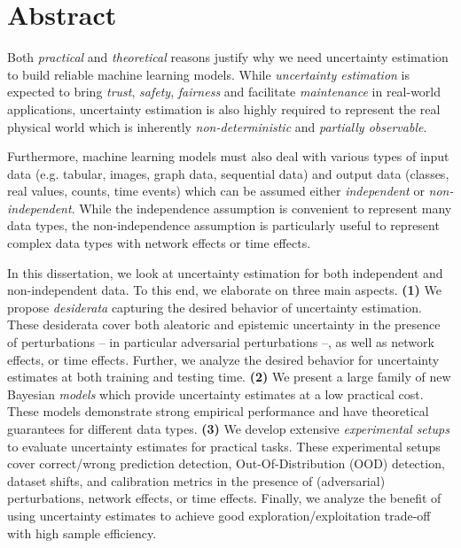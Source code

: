 \chapter*{Abstract}
%

Both \emph{practical} and \emph{theoretical} reasons justify why we need uncertainty estimation to build reliable machine learning models. While \emph{uncertainty estimation} is expected to bring \emph{trust}, \emph{safety}, \emph{fairness} and facilitate \emph{maintenance} in real-world applications, uncertainty estimation is also highly required to represent the real physical world which is inherently \emph{non-deterministic} and \emph{partially observable}. 

Furthermore, machine learning models must also deal with various types of input data (e.g. tabular, images, graph data, sequential data) and output data (classes, real values, counts, time events) which can be assumed either \emph{independent} or \emph{non-independent}. While the independence assumption is convenient to represent many data types, the non-independence assumption is particularly useful to represent complex data types with network effects or time effects.

In this dissertation, we look at uncertainty estimation for both independent and non-independent data. To this end, we elaborate on three main aspects. \textbf{(1)} We propose \emph{desiderata} capturing the desired behavior of uncertainty estimation. These desiderata cover both aleatoric and epistemic uncertainty in the presence of perturbations -- in particular adversarial perturbations --, as well as network effects, or time effects. Further, we analyze the desired behavior for uncertainty estimates at both training and testing time. \textbf{(2)} We present a large family of new Bayesian \emph{models} which provide uncertainty estimates at a low practical cost. These models demonstrate strong empirical performance and have theoretical guarantees for different data types. \textbf{(3)} We develop extensive \emph{experimental setups} to evaluate uncertainty estimates for practical tasks. These experimental setups cover correct/wrong prediction detection, Out-Of-Distribution (OOD) detection, dataset shifts, and calibration metrics in the presence of (adversarial) perturbations, network effects, or time effects. Finally, we analyze the benefit of using uncertainty estimates to achieve good exploration/exploitation trade-off with high sample efficiency.
